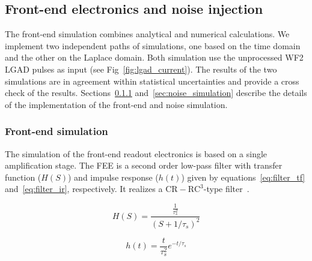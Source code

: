 \documentclass[preprint,1p]{elsarticle}
\begin{document}
\subsection{Front-end electronics and noise injection}
\label{sub_sec:fee_simulation_and_noise} The front-end simulation combines
analytical and numerical calculations. We implement two independent
paths of simulations, one based on the time domain and the other on the Laplace domain.
Both simulation use the unprocessed WF2 LGAD pulses as input (see Fig~\ref{fig:lgad_current}).
The results of the two simulations are in agreement within statistical uncertainties and provide a
cross check of the results. Sections~\ref{sec:fee}
and~\ref{sec:noise_simulation} describe the details of the implementation of the
front-end and noise simulation.

\subsubsection{Front-end simulation}\label{sec:fee}
The simulation of the front-end readout electronics is based on a single amplification stage.
The FEE is a second order low-pass filter with transfer function ($H(S)$)
and impulse response ($h(t)$) given by equations~\ref{eq:filter_tf} and~\ref{eq:filter_ir}, respectively.
It realizes a $\mathrm{CR-RC}^{3}$-type filter~\cite{Sansen}.

 \begin{equation}\label{eq:filter_tf}
   H(S) = \frac{\frac{1}{\tau_{s}^{2}}}{(S+1/\tau_{s})^{2}}
 \end{equation}

 \begin{equation}\label{eq:filter_ir}
     h(t) = \frac{t}{\tau_s^2}e^{-t/\tau_{s}}
 \end{equation}
\end{document}
